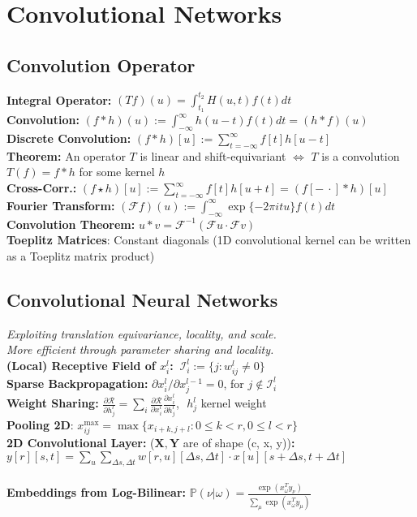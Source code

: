 \color{black}
\section*{Convolutional Networks}
\subsection*{Convolution Operator}
\textbf{Integral Operator:}
$\left(Tf\right)(u)=\int_{t_1}^{t_2} H(u,t)f(t)dt$\\
\textbf{Convolution:}
$(f*h)(u):=\int_{-\infty}^{\infty} h(u - t)f(t) dt = (h * f)(u)$\\
\textbf{Discrete Convolution:} $(f*h)[u]:=\sum_{t=-\infty}^{\infty}f[t]h[u-t]$\\
\textbf{Theorem:} An operator $T$ is linear and shift-equivariant $\iff$ $T$ is a convolution $T(f) = f \ast h$ for some kernel $h$\\
\textbf{Cross-Corr.:} $(f\star h)[u]:=\sum_{t=-\infty}^{\infty}f[t]h[u+t] = (f[-\ \cdot]*h)[u]$\\
\textbf{Fourier Transform:} $(\mathcal{F}f)(u):=\int_{-\infty}^{\infty}\exp\{-2\pi itu\}f(t)dt$\\
\textbf{Convolution Theorem:} $u * v = \mathcal F^{-1}(\mathcal F u \cdot \mathcal F v)$\\
\textbf{Toeplitz Matrices}: Constant diagonals (1D convolutional kernel can be written as a Toeplitz matrix product)
\subsection*{Convolutional Neural Networks}
\textit{Exploiting translation equivariance, locality, and scale.\\
More efficient through parameter sharing and locality.} \\
\textbf{(Local) Receptive Field of $x_i^l$:} $\ \mathcal{I}_i^l:=\{j:w_{ij}^l\neq 0 \}$\\
\textbf{Sparse Backpropagation:} $\partial x_i^l/\partial x_j^{l-1}=0$, for $j\notin \mathcal{I}_i^l$\\
\textbf{Weight Sharing:} $\tfrac{\partial\mathcal{R}}{\partial h_j^l} = \sum_i\tfrac{\partial\mathcal{R}}{\partial x_i^l}\tfrac{\partial x_i^l}{\partial h_j^l}$,\,\, $h_j^l$ kernel weight\\
\textbf{Pooling 2D}: $x_{ij}^{\max}=\max\{x_{i+k,j+l}:0\leq k< r,0\leq l< r\}$\\
\textbf{2D Convolutional Layer:} ($\mathbf{X,Y}$ are of shape (c, x, y))\textbf{:}\\ $y[r][s,t]=\sum_u\sum_{\Delta s,\Delta t}w[r,u][\Delta s, \Delta t]\cdot x[u][s+\Delta s, t+\Delta t]$\\
\\
\textbf{Embeddings from Log-Bilinear:} $\mathbb{P}(\nu|\omega) = \tfrac{\exp(x_\omega^T y_{\nu})}{\sum_\mu \exp(x_\omega^T y_\mu)}$
\color{red}